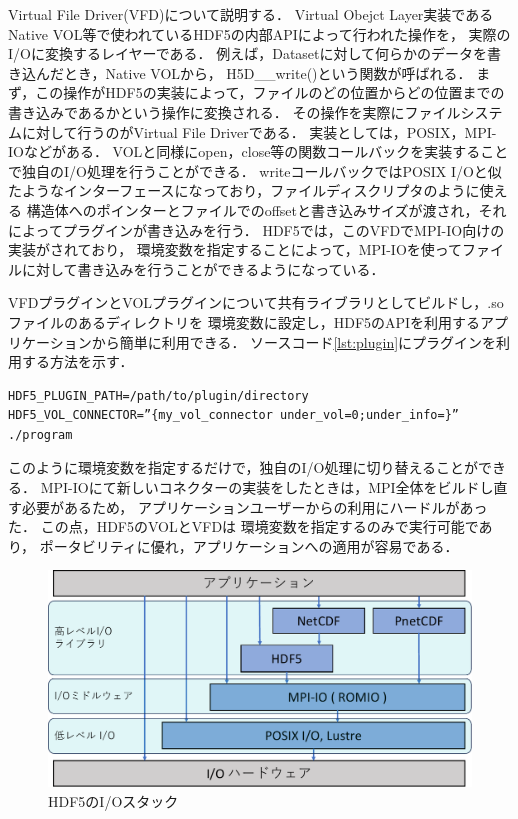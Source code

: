 \documentclass[submit,techrep,noauthor]{ipsj}
\begin{document}
Virtual File Driver(VFD)について説明する．
Virtual Obejct Layer実装であるNative VOL等で使われているHDF5の内部APIによって行われた操作を，
実際のI/Oに変換するレイヤーである．
例えば，Datasetに対して何らかのデータを書き込んだとき，Native VOLから，
H5D\_\_write()という関数が呼ばれる．
まず，この操作がHDF5の実装によって，ファイルのどの位置からどの位置までの書き込みであるかという操作に変換される．
その操作を実際にファイルシステムに対して行うのがVirtual File Driverである．
実装としては，POSIX，MPI-IOなどがある．
VOLと同様にopen，close等の関数コールバックを実装することで独自のI/O処理を行うことができる．
writeコールバックではPOSIX I/Oと似たようなインターフェースになっており，ファイルディスクリプタのように使える
構造体へのポインターとファイルでのoffsetと書き込みサイズが渡され，それによってプラグインが書き込みを行う．
HDF5では，このVFDでMPI-IO向けの実装がされており，
環境変数を指定することによって，MPI-IOを使ってファイルに対して書き込みを行うことができるようになっている．

VFDプラグインとVOLプラグインについて共有ライブラリとしてビルドし，.soファイルのあるディレクトリを
環境変数に設定し，HDF5のAPIを利用するアプリケーションから簡単に利用できる．
ソースコード\ref{lst:plugin}にプラグインを利用する方法を示す．
\begin{lstlisting}[caption=プラグインの利用方法, label=lst:plugin]
HDF5_PLUGIN_PATH=/path/to/plugin/directory HDF5_VOL_CONNECTOR=”{my_vol_connector under_vol=0;under_info=}” ./program
\end{lstlisting}
このように環境変数を指定するだけで，独自のI/O処理に切り替えることができる．
MPI-IOにて新しいコネクターの実装をしたときは，MPI全体をビルドし直す必要があるため，
アプリケーションユーザーからの利用にハードルがあった．
この点，HDF5のVOLとVFDは
環境変数を指定するのみで実行可能であり，
ポータビリティに優れ，アプリケーションへの適用が容易である．


\begin{figure}[t]
	\centering
	\includegraphics[page=7,width=\linewidth]{figure-crop.pdf}
	\caption{HDF5のI/Oスタック}
	\label{fig:hdf5stack}
\end{figure}
\end{document}
